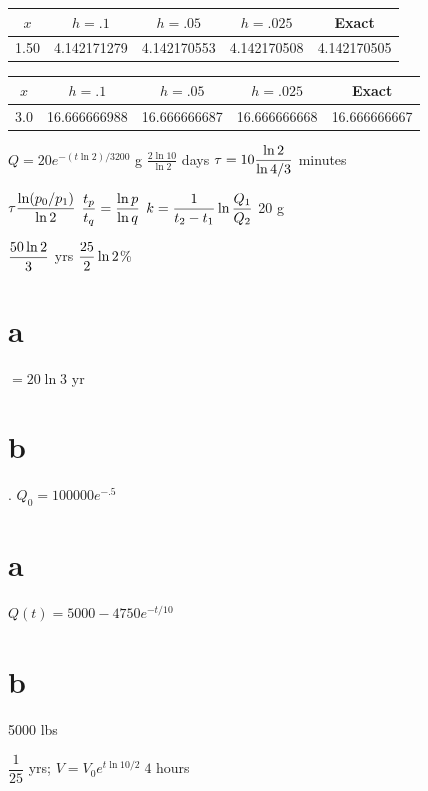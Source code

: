 {\small
{}
\begin{tabular}{|r|r|r|r|r|}
\hline
\multicolumn{1}{|c|}{$x$}&
\multicolumn{1}{|c|}{$h=.1$}&
\multicolumn{1}{|c|}{$h=.05$}&
\multicolumn{1}{|c|}{$h=.025$}&
\multicolumn{1}{|c|}{Exact}\\ \hline
 1.50  &   4.142171279 &  4.142170553 &   4.142170508 &  4.142170505 \\
\hline
\end{tabular}}\bigskip

{\small
{}
\begin{tabular}{|r|r|r|r|r|}
\hline
\multicolumn{1}{|c|}{$x$}&
\multicolumn{1}{|c|}{$h=.1$}&
\multicolumn{1}{|c|}{$h=.05$}&
\multicolumn{1}{|c|}{$h=.025$}&
\multicolumn{1}{|c|}{Exact}\\ \hline
 3.0 &  16.666666988 & 16.666666687 & 16.666666668 &  16.666666667 \\
\hline
\end{tabular}}

\bigskip




 $Q=20e^{-(t\ln2)/3200}$ g
   $\frac{2\ln10}{\ln2}$ days
  $\displaystyle{\tau=10\frac{\ln2}{\ln4/3}}$ minutes

 $\displaystyle{\tau \frac{\ln(p_0/p_1)}{\ln2}}$
  $\displaystyle{\frac{t_p}{t_q}=\frac{\ln p}{\ln q}}$
  $\displaystyle{k=\frac{1}{t_2-t_1}\ln \frac{Q_1}{Q_2}}$
  20 g

  $\displaystyle{\frac{50\ln2}{3}}$ yrs
  $\displaystyle{\frac{25}{2}\ln2}$\%

 \part{a} $=20\ln3$ yr
  \part{b}.  $Q_0=100000e^{-.5}$
 \part{a} $Q(t)=5000-4750e^{-t/10}$ \part{b} 5000 lbs

 $\dfrac{1}{25}$ yrs;
 $V=V_0e^{t\ln10/2}\; 4$ hours

